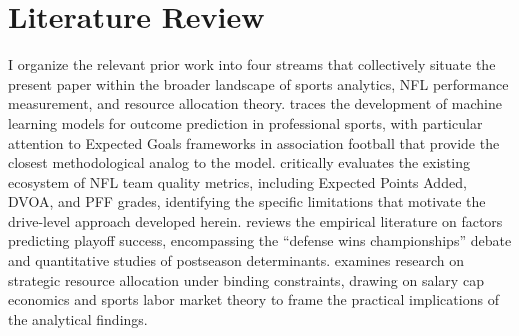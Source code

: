 \chapter{Literature Review}
\label{ch:literature}

I organize the relevant prior work into four streams that collectively situate the present paper within the broader landscape of sports analytics, NFL performance measurement, and resource allocation theory.  traces the development of machine learning models for outcome prediction in professional sports, with particular attention to Expected Goals frameworks in association football that provide the closest methodological analog to the \xscore{} model.  critically evaluates the existing ecosystem of NFL team quality metrics, including Expected Points Added, DVOA, and PFF grades, identifying the specific limitations that motivate the drive-level approach developed herein.  reviews the empirical literature on factors predicting playoff success, encompassing the ``defense wins championships'' debate and quantitative studies of postseason determinants.  examines research on strategic resource allocation under binding constraints, drawing on salary cap economics and sports labor market theory to frame the practical implications of the analytical findings.





